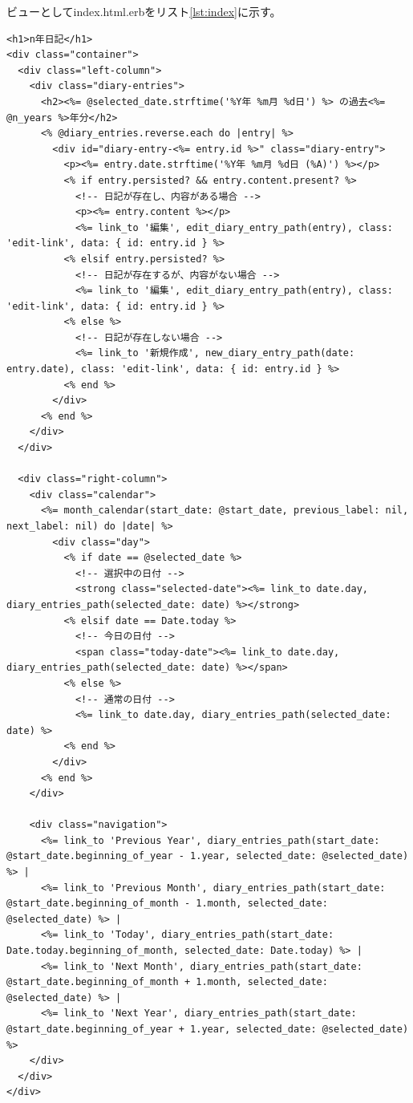 \documentclass[dvipdfmx,fleqn,article]{jlreq}
\begin{document}
ビューとしてindex.html.erbをリスト\ref{lst:index}に示す。

\begin{lstlisting}[language=CSharp, caption=index.html.erb, label={lst:index}]
<h1>n年日記</h1>
<div class="container">
  <div class="left-column">
    <div class="diary-entries">
      <h2><%= @selected_date.strftime('%Y年 %m月 %d日') %> の過去<%= @n_years %>年分</h2>
      <% @diary_entries.reverse.each do |entry| %>
        <div id="diary-entry-<%= entry.id %>" class="diary-entry">
          <p><%= entry.date.strftime('%Y年 %m月 %d日 (%A)') %></p>
          <% if entry.persisted? && entry.content.present? %>
            <!-- 日記が存在し、内容がある場合 -->
            <p><%= entry.content %></p>
            <%= link_to '編集', edit_diary_entry_path(entry), class: 'edit-link', data: { id: entry.id } %>
          <% elsif entry.persisted? %>
            <!-- 日記が存在するが、内容がない場合 -->
            <%= link_to '編集', edit_diary_entry_path(entry), class: 'edit-link', data: { id: entry.id } %>
          <% else %>
            <!-- 日記が存在しない場合 -->
            <%= link_to '新規作成', new_diary_entry_path(date: entry.date), class: 'edit-link', data: { id: entry.id } %>
          <% end %>
        </div>
      <% end %>
    </div>
  </div>

  <div class="right-column">
    <div class="calendar">
      <%= month_calendar(start_date: @start_date, previous_label: nil, next_label: nil) do |date| %>
        <div class="day">
          <% if date == @selected_date %>
            <!-- 選択中の日付 -->
            <strong class="selected-date"><%= link_to date.day, diary_entries_path(selected_date: date) %></strong>
          <% elsif date == Date.today %>
            <!-- 今日の日付 -->
            <span class="today-date"><%= link_to date.day, diary_entries_path(selected_date: date) %></span>
          <% else %>
            <!-- 通常の日付 -->
            <%= link_to date.day, diary_entries_path(selected_date: date) %>
          <% end %>
        </div>
      <% end %>
    </div>

    <div class="navigation">
      <%= link_to 'Previous Year', diary_entries_path(start_date: @start_date.beginning_of_year - 1.year, selected_date: @selected_date) %> |
      <%= link_to 'Previous Month', diary_entries_path(start_date: @start_date.beginning_of_month - 1.month, selected_date: @selected_date) %> |
      <%= link_to 'Today', diary_entries_path(start_date: Date.today.beginning_of_month, selected_date: Date.today) %> |
      <%= link_to 'Next Month', diary_entries_path(start_date: @start_date.beginning_of_month + 1.month, selected_date: @selected_date) %> |
      <%= link_to 'Next Year', diary_entries_path(start_date: @start_date.beginning_of_year + 1.year, selected_date: @selected_date) %>
    </div>
  </div>
</div>
    
\end{lstlisting}
\end{document}
